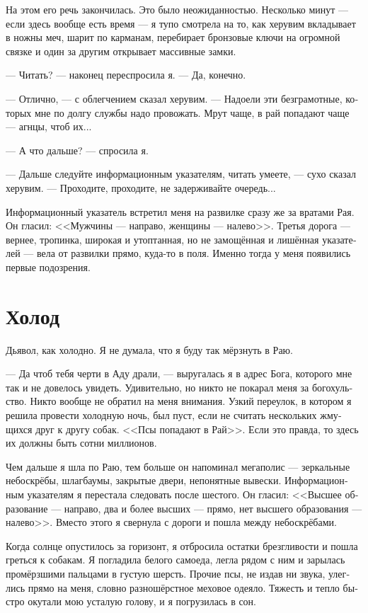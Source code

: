 \documentclass[a4paper,12pt,fleqn]{book}\usepackage{polyglossia}\setdefaultlanguage[babelshorthands=true]{russian}\setotherlanguage{english}\defaultfontfeatures{Ligatures=TeX,Mapping=tex-text}\usepackage{xcolor}\newcommand{\ml}[3]{#2}
\begin{document}
На этом его речь закончилась.
Это было неожиданностью.
Несколько минут --- если здесь вообще есть время --- я тупо смотрела на то, как херувим вкладывает в ножны меч, шарит по карманам, перебирает бронзовые ключи на огромной связке и один за другим открывает массивные замки.

--- Читать? --- наконец переспросила я.
--- Да, конечно.

--- Отлично, --- с облегчением сказал херувим.
--- Надоели эти безграмотные, которых мне по долгу службы надо провожать.
Мрут чаще, в рай попадают чаще --- агнцы, чтоб их...

--- А что дальше? --- спросила я.

--- Дальше следуйте информационным указателям, читать умеете, --- сухо сказал херувим.
--- Проходите, проходите, не задерживайте очередь...

Информационный указатель встретил меня на развилке сразу же за вратами Рая.
Он гласил: <<Мужчины --- направо, женщины --- налево>>.
Третья дорога --- вернее, тропинка, широкая и утоптанная, но не замощённая и лишённая указателей --- вела от развилки прямо, куда-то в поля.
Именно тогда у меня появились первые подозрения.

\section{Холод}

Дьявол, как холодно.
Я не думала, что я буду так мёрзнуть в Раю.

--- Да чтоб тебя черти в Аду драли, --- выругалась я в адрес Бога, которого мне так и не довелось увидеть.
Удивительно, но никто не покарал меня за богохульство.
Никто вообще не обратил на меня внимания.
Узкий переулок, в котором я решила провести холодную ночь, был пуст, если не считать нескольких жмущихся друг к другу собак.
<<Псы попадают в Рай>>.
Если это правда, то здесь их должны быть сотни миллионов.

Чем дальше я шла по Раю, тем больше он напоминал мегаполис --- зеркальные небоскрёбы, шлагбаумы, закрытые двери, непонятные вывески.
Информационным указателям я перестала следовать после шестого.
Он гласил: <<Высшее образование --- направо, два и более высших --- прямо, нет высшего образования --- налево>>.
Вместо этого я свернула с дороги и пошла между небоскрёбами.

Когда солнце опустилось за горизонт, я отбросила остатки брезгливости и пошла греться к собакам.
Я погладила белого самоеда, легла рядом с ним и зарылась промёрзшими пальцами в густую шерсть.
Прочие псы, не издав ни звука, улеглись прямо на меня, словно разношёрстное меховое одеяло.
Тяжесть и тепло быстро окутали мою усталую голову, и я погрузилась в сон.
\end{document}
